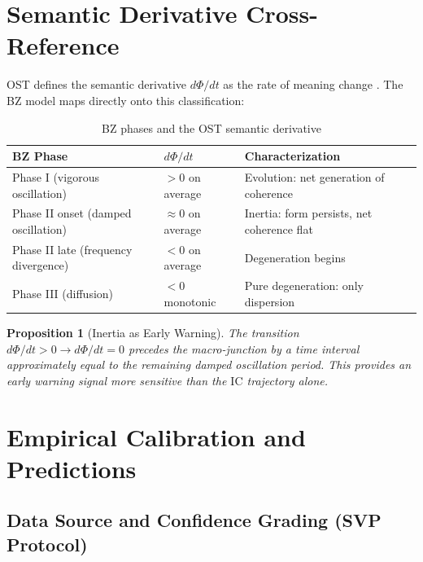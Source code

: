 \documentclass[12pt,a4paper]{article}
\newtheorem{proposition}{Proposition}[section]
\newcommand{\IC}{\mathrm{IC}}
\begin{document}
\section{Semantic Derivative Cross-Reference}\label{sec:semantic_derivative}

OST defines the semantic derivative $d\Phi/dt$ as the rate of meaning change \cite{ost_v21}. The BZ model maps directly onto this classification:

\begin{table}[H]
\centering
\caption{BZ phases and the OST semantic derivative}
\label{tab:semantic_derivative}
\begin{tabular}{@{}llp{5cm}@{}}
\toprule
\textbf{BZ Phase} & \textbf{$d\Phi/dt$} & \textbf{Characterization} \\
\midrule
Phase I (vigorous oscillation) & $> 0$ on average & Evolution: net generation of coherence \\
Phase II onset (damped oscillation) & $\approx 0$ on average & Inertia: form persists, net coherence flat \\
Phase II late (frequency divergence) & $< 0$ on average & Degeneration begins \\
Phase III (diffusion) & $< 0$ monotonic & Pure degeneration: only dispersion \\
\bottomrule
\end{tabular}
\end{table}

\begin{proposition}[Inertia as Early Warning]\label{prop:inertia}
The transition $d\Phi/dt > 0 \to d\Phi/dt = 0$ precedes the macro-junction by a time interval approximately equal to the remaining damped oscillation period. This provides an early warning signal more sensitive than the $\IC$ trajectory alone.
\end{proposition}


\section{Empirical Calibration and Predictions}\label{sec:predictions}

\subsection{Data Source and Confidence Grading (SVP Protocol)}
\end{document}
